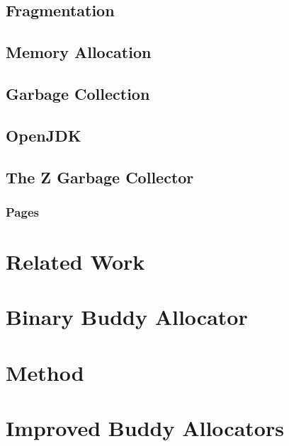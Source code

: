 \documentclass[a4paper,12pt]{article}
\begin{document}
\subsection{Fragmentation}
\label{sec:fragmentation}


\subsection{Memory Allocation}
\label{sec:memory_allocation}


\subsection{Garbage Collection}
\label{sec:gc}


\subsection{OpenJDK}
\label{sec:openjdk}


\subsection{The Z Garbage Collector}
\label{sec:zgc}


\subsubsection{Pages}
\label{sec:zpage}


\newpage
\section{Related Work}
\label{sec:relatedwork}


\newpage
\section{Binary Buddy Allocator}
\label{sec:buddy}


\clearpage
\section{Method}
\label{sec:method}


\newpage
\section{Improved Buddy Allocators}
\label{sec:buddyadditions}

\end{document}
